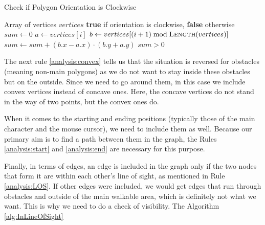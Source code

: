 \begin{algorithm}[H]
\caption{Check if Polygon Orientation is Clockwise}\label{alg:IsOrientationClockwise}
\begin{algorithmic}[1]
\Require Array of vertices $vertices$
\Ensure \textbf{true} if orientation is clockwise, \textbf{false} otherwise
\Statex
{}
    \State $sum \gets 0$
        \State $a \gets vertices[i]$
        \State $b \gets vertices[(i + 1) \bmod \Call{Length}{vertices}]$
        \State $sum \gets sum + (b.x - a.x) \cdot (b.y + a.y)$
    \EndFor
    \State \Return $sum > 0$
\EndFunction
\end{algorithmic}
\end{algorithm}

The next rule \ref{analysis:convex} tells us that the situation is reversed for obstacles (meaning non-main polygons) as we do not want to stay inside these obstacles but on the outside. Since we need to go around them, in this case we include convex vertices instead of concave ones. Here, the concave vertices do not stand in the way of two points, but the convex ones do. 

When it comes to the starting and ending positions (typically those of the main character and the mouse cursor), we need to include them as well. Because our primary aim is to find a path between them in the graph, the Rules \ref{analysis:start} and \ref{analysis:end} are necessary for this purpose.

Finally, in terms of edges, an edge is included in the graph only if the two nodes that form it are within each other's line of sight, as mentioned in Rule \ref{analysis:LOS}. If other edges were included, we would get edges that run through obstacles and outside of the main walkable area, which is definitely not what we want. This is why we need to do a check of visibility. The Algorithm \ref{alg:InLineOfSight} 


